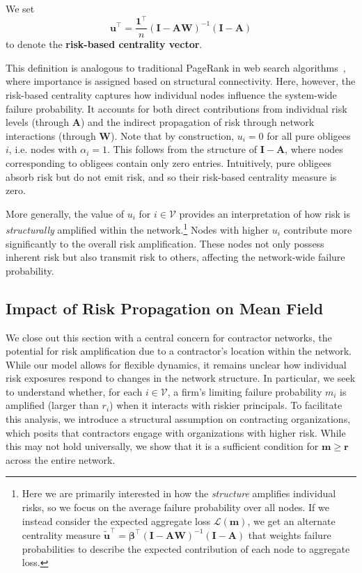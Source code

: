 \documentclass[mnsc,nonblindrev]{informs3}
\newcommand{\GAR}{\mathcal{L}}
\newcommand{\rvec}{\mathbf{r}}
\newcommand{\V}{\mathcal{V}}
\newcommand{\A}{\mathbf{A}}
\newcommand{\W}{\mathbf{W}}
\newcommand{\I}{\mathbf{I}}
\newcommand{\betavec}{\mathbf{\beta}}
\newcommand{\uvec}{\mathbf{u}}
\newcommand{\mean}{m}
\newcommand{\meanvec}{\mathbf{\mean}}
\begin{document}
\begin{definition}
\label{def:page_rank}
    We set
    \begin{equation}
    \label{eq:network_page_rank}
    \uvec^\top = \frac{\mathbf{1}^\top}{n}(\I-\A\W)^{-1}(\I-\A)
    \end{equation}
    to denote the {\bf risk-based centrality vector}.
\end{definition}
This definition is analogous to traditional PageRank in web search algorithms~\citep{BRIN1998107,page1999pagerank,kleinberg1999authoritative}, where importance is assigned based on structural connectivity.  Here, however, the risk-based centrality captures how individual nodes influence the system-wide failure probability. It accounts for both direct contributions from individual risk levels (through $\A$) and the indirect propagation of risk through network interactions (through $\W$).
Note that by construction, $u_i = 0$ for all pure obligees $i$, i.e. nodes with $\alpha_i = 1$.  This follows from the structure of $\I - \A$, where nodes corresponding to obligees contain only zero entries.  Intuitively, pure obligees absorb risk but do not emit risk, and so their risk-based centrality measure is zero.

More generally, the value of $u_i$ for $i \in \V$ provides an interpretation of how risk is \emph{structurally} amplified within the network.\footnote{Here we are primarily interested in how the \emph{structure} amplifies individual risks, so we focus on the average failure probability over all nodes.  If we instead consider the expected aggregate loss $\GAR(\meanvec)$, we get an alternate centrality measure $\tilde{\uvec}^\top = \betavec^\top(\I-\A\W)^{-1}(\I-\A)$ that weights failure probabilities to describe the expected contribution of each node to aggregate loss.}
Nodes with higher $u_i$ contribute more significantly to the overall risk amplification.  These nodes not only possess inherent risk but also transmit risk to others, affecting the network-wide failure probability.


\subsection{Impact of Risk Propagation on Mean Field}
\label{sec:marginal_risk_increase}
We close out this section with a central concern for contractor networks, the potential for risk amplification due to a contractor's location within the network.  While our model allows for flexible dynamics, it remains unclear how individual risk exposures respond to changes in the network structure.  In particular, we seek to understand whether, for each $i \in \mathcal{V}$, a firm's limiting failure probability $\mean_i$ is amplified (larger than $r_i$) when it interacts with riskier principals.  To facilitate this analysis, we introduce a structural assumption on contracting organizations, which posits that contractors engage with organizations with higher risk. While this may not hold universally, we show that it is a sufficient condition for $\meanvec \geq \rvec$ across the entire network.
\end{document}
